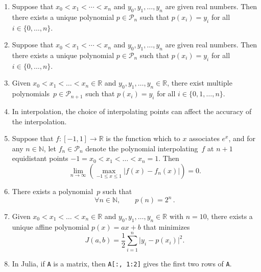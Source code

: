 \documentclass{article}
\newcommand{\julia}[1]{\texttt{#1}}
\begin{document}
\begin{enumerate}

    \item
        Suppose that $x_0 < x_1 < \dotsb < x_n$ and $y_0, y_1, \dotsc, y_n$ are given real numbers.
        Then there exists a unique polynomial $p \in \mathcal P_n$ such that $p(x_i) = y_i$ for all $i \in \{0, \dotsc, n\}$.

    \item
        Suppose that $x_0 < x_1 < \dotsb < x_n$ and $y_0, y_1, \dotsc, y_n$ are given real numbers.
        Then there exists a unique polynomial $p \in \mathcal P_n$ such that $p(x_i) = y_i$ for all $i \in \{0, \dotsc, n\}$.

    \item
        Given $x_0 < x_1 < \dotsc < x_n \in \mathbb R$
        and $y_0, y_1, \dotsc , y_n \in \mathbb R$,
        there exist multiple polynomials~$p \in \mathcal P_{n+1}$ such that $p(x_i) = y_i$ for all $i \in \{0, 1, \dotsc, n\}$.

    \item
        In interpolation, the choice of interpolating points can affect the accuracy of the interpolation.

    \item
        Suppose that $f \colon [-1, 1] \to \mathbb R$ is the function which to $x$ associates $e^x$,
        and for any $n \in \mathbb N$,
        let $f_n \in \mathcal P_n$ denote the polynomial interpolating~$f$ at $n+1$ equidistant points $-1 = x_0 < x_1 < \dotsc < x_n = 1$.
        Then
        \[
            \lim_{n \to \infty} \left( \max_{-1 \leq x \leq 1} \bigl\lvert f(x) - f_n(x) \bigr\rvert \right) = 0.
        \]

    \item
        There exists a polynomial~$p$ such that
        \[
            \forall n \in \mathbb N, \qquad
            p(n) = 2^n \, .
        \]

    \item
        Given $x_0 < x_1 < \dotsc < x_n \in \mathbb R$
        and $y_0, y_1, \dotsc , y_n \in \mathbb R$ with $n = 10$,
        there exists a unique affine polynomial $p(x) = ax + b$ that minimizes
        \[
            J(a, b) = \frac{1}{2} \sum_{i=1}^n \bigl\lvert y_i - p(x_i) \bigr\rvert^2.
        \]

    \item
        In Julia, if \julia{A} is a matrix,
        then \julia{A[:, 1:2]} gives the first two rows of \julia{A}.


\end{enumerate}
\end{document}
